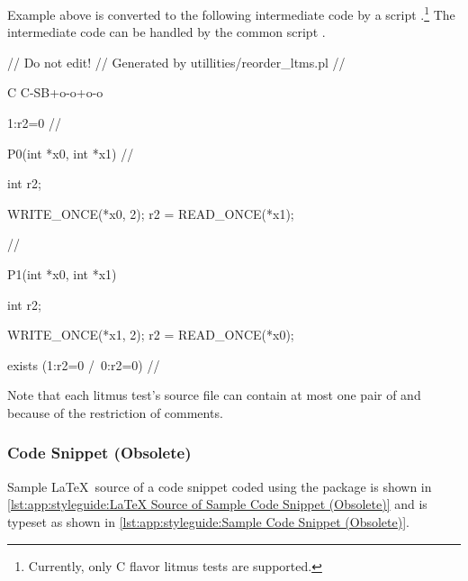 Example above is converted to the following intermediate code
by a script .\footnote{
	Currently, only C flavor litmus tests are supported.
}
The intermediate code can be handled
by the common script .

\begin{fcvlabel}
\begin{VerbatimN}[tabsize=8]
// Do not edit!
// Generated by utillities/reorder_ltms.pl
//\begin{snippet}[labelbase=ln:base,commandchars=\%\@\$]
C C-SB+o-o+o-o

{
1:r2=0			//
}

P0(int *x0, int *x1)		//
{
	int r2;

	WRITE_ONCE(*x0, 2);
	r2 = READ_ONCE(*x1);
}				//

P1(int *x0, int *x1)
{
	int r2;

	WRITE_ONCE(*x1, 2);
	r2 = READ_ONCE(*x0);
}

exists (1:r2=0 /\ 0:r2=0)  
//\end{snippet}
\end{VerbatimN}
\end{fcvlabel}

Note that each litmus test's source file can contain at most one
pair of \co{\\begin[snippet]} and \co{\\end[snippet]} because of
the restriction of comments.

\subsubsection{Code Snippet (Obsolete)}
\label{sec:app:styleguide:Code Snippet (Obsolete)}

Sample \LaTeX\ source of a code snippet coded using
the  package is shown in
\cref{lst:app:styleguide:LaTeX Source of Sample Code Snippet (Obsolete)}
and is typeset as shown in
\cref{lst:app:styleguide:Sample Code Snippet (Obsolete)}.

\begin{listing}
\begin{fcvlabel}
\end{fcvlabel}
\vspace*{-9pt}
\caption{\LaTeX\ Source of Sample Code Snippet (Obsolete)}
\label{lst:app:styleguide:LaTeX Source of Sample Code Snippet (Obsolete)}
\end{listing}

